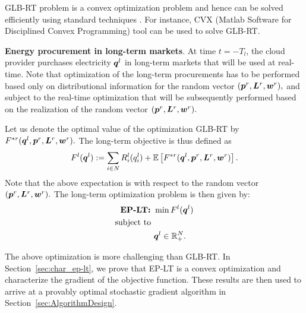 GLB-RT problem is a convex optimization problem and hence can be solved efficiently using standard techniques \cite{boyd2004convex}. For instance, CVX (Matlab Software for Disciplined Convex Programming) tool \cite{grant2008cvx} can be used to solve GLB-RT. 


\textbf{Energy procurement in long-term markets}. At time $t=-T_l$,
the cloud provider purchases electricity $\boldsymbol{q}^l$ in
long-term markets that will be used at real-time. Note that
optimization of the long-term procurements has to be performed based
only on distributional information for the random vector
$(\boldsymbol{p}^r,\boldsymbol{L}^r,\boldsymbol{w}^r),$ and subject to the
real-time optimization that will be subsequently performed based on
the realization of the random vector
$(\boldsymbol{p}^r,\boldsymbol{L}^r,\boldsymbol{w}^r).$ 

Let us denote the optimal value of the optimization GLB-RT by
$F^{*r}(\boldsymbol{q}^l,\boldsymbol{p}^r, \boldsymbol{L}^r, \boldsymbol{w}^r).$ The
long-term objective is thus defined as $$F^l(\boldsymbol{q}^l) :=
\sum_{i\in N} R^l_i(q^l_i) + \mathbb{E}\left[F^{*r}(\boldsymbol{q}^l,\boldsymbol{p}^r,
	\boldsymbol{L}^r, \boldsymbol{w}^r)\right].$$ Note that the above expectation is
with respect to the random vector
$(\boldsymbol{p}^r,\boldsymbol{L}^r,\boldsymbol{w}^r).$ The long-term optimization
problem is then given by:
\begin{subequations}
	\begin{align*}
	\text{\bf{EP-LT}: }  & \min F^l(\boldsymbol{q}^l) \\
	\mbox{subject to } \nonumber \\
	& \boldsymbol{q}^l \in \mathbb{R}^N_+.
	\end{align*}
\end{subequations}

The above optimization is more challenging than GLB-RT. In
Section~\ref{sec:char_ep-lt}, we prove that EP-LT is a convex
optimization and characterize the gradient of the objective
function. These results are then used to arrive at a provably optimal stochastic gradient algorithm in Section~\ref{sec:AlgorithmDesign}.
